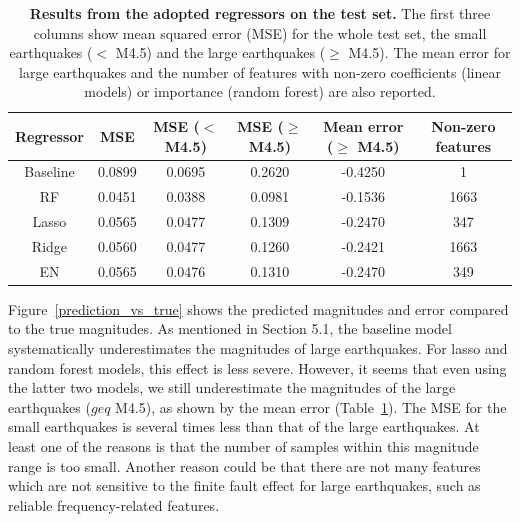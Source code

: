 \documentclass{article} %
\begin{document}
\begin{table}[htbp]
	\small
	\centering
	\begin{tabular}{@{}|c|c|c|c|c|c|@{}} %
		\hline
		\cline{2-4}
		Regressor & MSE & MSE ($<$ M4.5) & MSE ($\geq$ M4.5) & Mean error ($\geq$ M4.5) & Non-zero features\\ \hline \hline
		Baseline & 0.0899 & 0.0695 & 0.2620 & -0.4250  & 1 \\
		RF & 0.0451 & 0.0388 & 0.0981 & -0.1536 & 1663 \\ 
		Lasso &  0.0565 & 0.0477 & 0.1309 & -0.2470 & 347 \\ 
		Ridge & 0.0560 & 0.0477 & 0.1260 & -0.2421 & 1663 \\ 
		EN & 0.0565 & 0.0476 & 0.1310 & -0.2470 & 349 \\ \hline
	\end{tabular}
	\caption{{\bf Results from the adopted regressors on the test set.} The first three columns show mean squared error (MSE) for the whole test set, the small earthquakes ($<$ M4.5) and the large earthquakes ($\geq$ M4.5). The mean error for large earthquakes and the number of features with non-zero coefficients (linear models) or importance (random forest) are also reported.}
	\label{tab1}
\end{table}

Figure~\ref{prediction_vs_true} shows the predicted magnitudes and error compared to the true magnitudes. As mentioned in Section 5.1, the baseline model systematically underestimates the magnitudes of large earthquakes. For lasso and random forest models, this effect is less severe. However, it seems that even using the latter two models, we still underestimate the magnitudes of the large earthquakes ($geq$ M4.5), as shown by the mean error (Table~\ref{tab1}). The MSE for the small earthquakes is several times less than that of the large earthquakes. At least one of the reasons is that the number of samples within this magnitude range is too small. Another reason could be that there are not many features which are not sensitive to the finite fault effect for large earthquakes, such as reliable frequency-related features.      
\end{document}
